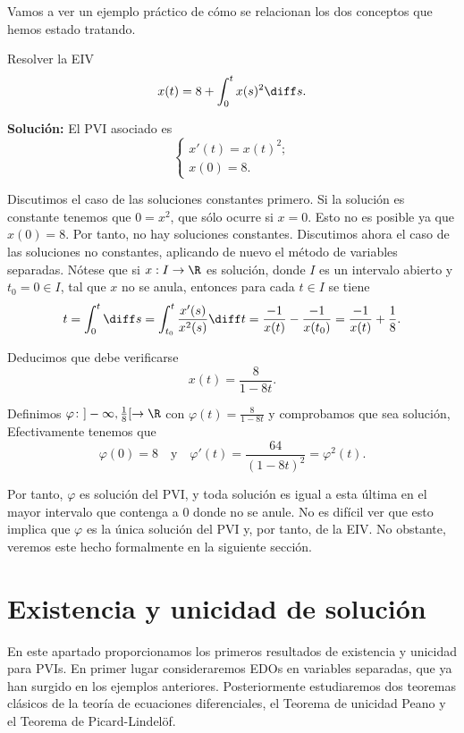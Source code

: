 \documentclass{article}
\begin{document}
Vamos a ver un ejemplo práctico de cómo se relacionan los dos conceptos que hemos estado tratando.

\begin{ex}
  Resolver la EIV
  \[x(t) = 8 + \displaystyle\int_0^t x(s)^2 \diff s. \]
  

  \textbf{Solución:} El PVI asociado es
  \[
    \left\{
      \begin{array}{l}
        x'(t) = x(t)^2; \\
        x(0) = 8.
      \end{array}
    \right.
  \]

  Discutimos el caso de las soluciones constantes primero. Si la solución es constante tenemos que
  $0 = x^2$, que sólo ocurre si $x = 0$.  Esto no es posible ya que $x(0) = 8$. Por tanto, no hay
  soluciones constantes. Discutimos ahora el caso de las soluciones no constantes, aplicando de
  nuevo el método de variables separadas. Nótese que si $x: I \to \R$ es solución, donde $I$ es un
  intervalo abierto y $t_0 = 0 \in I$, tal que $x$ no se anula, entonces para cada $t \in I$ se
  tiene
  \[ t = \int_0^t \diff s = \int_{t_0}^t \frac{x'(s)}{x^2(s)}\diff t = \frac{-1}{x(t)} -
    \frac{-1}{x(t_0)} = \frac{-1}{x(t)} + \frac{1}{8}. \]

  Deducimos que debe verificarse
  \[x(t) = \frac{8}{1 - 8t}.\]
    
  Definimos $\varphi \colon ]-\infty, \frac{1}{8}[ \to \R$ con $\varphi(t) = \frac{8}{1-8t}$ y comprobamos
  que sea solución, Efectivamente tenemos que
  \[ \varphi(0) = 8 \quad \text{y} \quad \varphi'(t) = \frac{64}{(1-8t)^2} = \varphi^2(t). \]

  Por tanto, $\varphi$ es solución del PVI, y toda solución es igual a esta última en el mayor
  intervalo que contenga a $0$ donde no se anule. No es difícil ver que esto implica que $\varphi$
  es la única solución del PVI y, por tanto, de la EIV. No obstante, veremos este hecho formalmente
  en la siguiente sección.
\end{ex}

\newpage

\section{Existencia y unicidad de solución} \label{sec:eu}

En este apartado proporcionamos los primeros resultados de existencia y unicidad para PVIs. En
primer lugar consideraremos EDOs en variables separadas, que ya han surgido en los ejemplos
anteriores. Posteriormente estudiaremos dos teoremas clásicos de la teoría de ecuaciones
diferenciales, el Teorema de unicidad Peano y el Teorema de Picard-Lindelöf.
\end{document}
